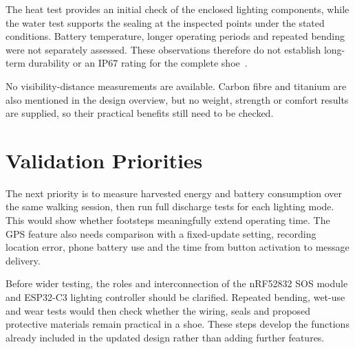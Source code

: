 The heat test provides an initial check of the enclosed lighting components, while the water test supports the sealing at the inspected points under the stated conditions. Battery temperature, longer operating periods and repeated bending were not separately assessed. These observations therefore do not establish long-term durability or an IP67 rating for the complete shoe~\cite{iec60529}.

No visibility-distance measurements are available. Carbon fibre and titanium are also mentioned in the design overview, but no weight, strength or comfort results are supplied, so their practical benefits still need to be checked.

\section{Validation Priorities}
The next priority is to measure harvested energy and battery consumption over the same walking session, then run full discharge tests for each lighting mode. This would show whether footsteps meaningfully extend operating time. The GPS feature also needs comparison with a fixed-update setting, recording location error, phone battery use and the time from button activation to message delivery.

Before wider testing, the roles and interconnection of the nRF52832 SOS module and ESP32-C3 lighting controller should be clarified. Repeated bending, wet-use and wear tests would then check whether the wiring, seals and proposed protective materials remain practical in a shoe. These steps develop the functions already included in the updated design rather than adding further features.
